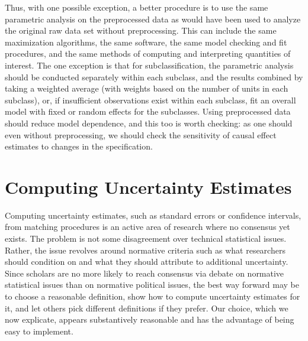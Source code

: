 \documentclass[11pt,titlepage]{article}
\begin{document}
Thus, with one possible exception, a better procedure is to use the
same parametric analysis on the preprocessed data as would have been
used to analyze the original raw data set without preprocessing.  This
can include the same maximization algorithms, the same software, the
same model checking and fit procedures, and the same methods of
computing and interpreting quantities of interest.  The one exception
is that for subclassification, the parametric analysis should be
conducted separately within each subclass, and the results combined by
taking a weighted average (with weights based on the number of units
in each subclass), or, if insufficient observations exist within each
subclass, fit an overall model with fixed or random effects for the
subclasses.  Using preprocessed data should reduce model dependence,
and this too is worth checking: as one should even without
preprocessing, we should check the sensitivity of causal effect
estimates to changes in the specification.

\section{Computing Uncertainty Estimates}

Computing uncertainty estimates, such as standard errors or confidence
intervals, from matching procedures is an active area of research
where no consensus yet exists.  The problem is not some disagreement
over technical statistical issues.  Rather, the issue revolves around
normative criteria such as what researchers should condition on and
what they should attribute to additional uncertainty.  Since scholars
are no more likely to reach consensus via debate on normative
statistical issues than on normative political issues, the best way
forward may be to choose a reasonable definition, show how to
compute uncertainty estimates for it, and let others pick different
definitions if they prefer.  Our choice, which we now explicate,
appears substantively reasonable and has the advantage of being easy
to implement.
\end{document}
